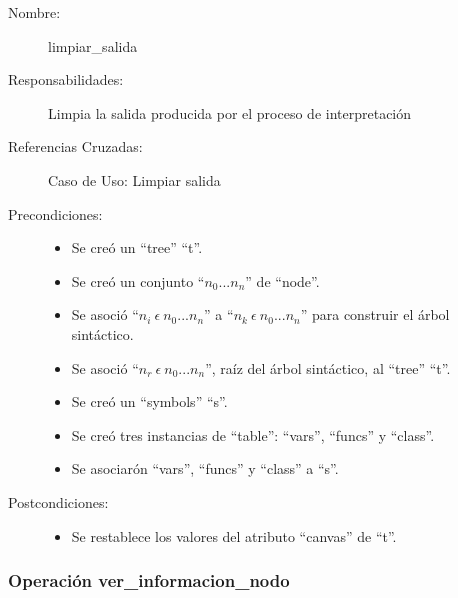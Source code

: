 	\begin{description}
		\item [Nombre:] limpiar\_salida
		\item [Responsabilidades:] Limpia la salida producida por el proceso de interpretación
		\item [Referencias Cruzadas: ] Caso de Uso: Limpiar salida
      \item [Precondiciones:] \hfill
         \begin {itemize}
         \item Se creó un ``tree'' ``t''.
         \item Se creó un conjunto ``$n_0...n_n$'' de ``node''.
         \item Se asoció ``$n_i\ \epsilon\ n_0...n_n$'' a ``$n_k\ \epsilon\ n_0...n_n$'' para construir el árbol sintáctico.
         \item Se asoció  ``$n_r\ \epsilon\ n_0...n_n$'', raíz del árbol sintáctico, al ``tree'' ``t''.
         \item Se creó un ``symbols'' ``s''.
         \item Se creó tres instancias de ``table'': ``vars'', ``funcs'' y ``class''.
         \item Se asociarón ``vars'', ``funcs'' y ``class'' a ``s''.
      \end{itemize}
      \item [Postcondiciones:] \hfill
      \begin {itemize}
         \item Se restablece los valores del atributo ``canvas'' de ``t''.
      \end{itemize}
	\end{description} 


\subsubsection{Operación ver\_informacion\_nodo}

